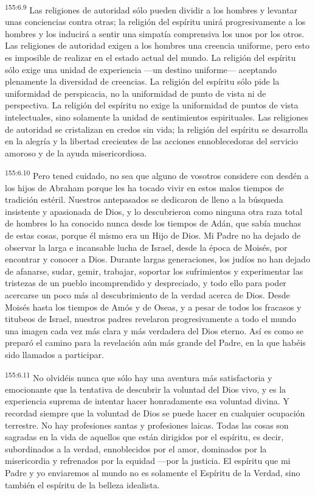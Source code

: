 \par 
\textsuperscript{155:6.9} Las religiones de autoridad sólo pueden dividir a los hombres y levantar unas conciencias contra otras; la religión del espíritu unirá progresivamente a los hombres y los inducirá a sentir una simpatía comprensiva los unos por los otros. Las religiones de autoridad exigen a los hombres una creencia uniforme, pero esto es imposible de realizar en el estado actual del mundo. La religión del espíritu sólo exige una unidad de experiencia ---un destino uniforme--- aceptando plenamente la diversidad de creencias. La religión del espíritu sólo pide la uniformidad de perspicacia, no la uniformidad de punto de vista ni de perspectiva. La religión del espíritu no exige la uniformidad de puntos de vista intelectuales, sino solamente la unidad de sentimientos espirituales. Las religiones de autoridad se cristalizan en credos sin vida; la religión del espíritu se desarrolla en la alegría y la libertad crecientes de las acciones ennoblecedoras del servicio amoroso y de la ayuda misericordiosa.

\par 
\textsuperscript{155:6.10} Pero tened cuidado, no sea que alguno de vosotros considere con desdén a los hijos de Abraham porque les ha tocado vivir en estos malos tiempos de tradición estéril. Nuestros antepasados se dedicaron de lleno a la búsqueda insistente y apasionada de Dios, y lo descubrieron como ninguna otra raza total de hombres lo ha conocido nunca desde los tiempos de Adán, que sabía muchas de estas cosas, porque él mismo era un Hijo de Dios. Mi Padre no ha dejado de observar la larga e incansable lucha de Israel, desde la época de Moisés, por encontrar y conocer a Dios. Durante largas generaciones, los judíos no han dejado de afanarse, sudar, gemir, trabajar, soportar los sufrimientos y experimentar las tristezas de un pueblo incomprendido y despreciado, y todo ello para poder acercarse un poco más al descubrimiento de la verdad acerca de Dios. Desde Moisés hasta los tiempos de Amós y de Oseas, y a pesar de todos los fracasos y titubeos de Israel, nuestros padres revelaron progresivamente a todo el mundo una imagen cada vez más clara y más verdadera del Dios eterno. Así es como se preparó el camino para la revelación aún más grande del Padre, en la que habéis sido llamados a participar.

\par 
\textsuperscript{155:6.11} No olvidéis nunca que sólo hay una aventura más satisfactoria y emocionante que la tentativa de descubrir la voluntad del Dios vivo, y es la experiencia suprema de intentar hacer honradamente esa voluntad divina. Y recordad siempre que la voluntad de Dios se puede hacer en cualquier ocupación terrestre. No hay profesiones santas y profesiones laicas. Todas las cosas son sagradas en la vida de aquellos que están dirigidos por el espíritu, es decir, subordinados a la verdad, ennoblecidos por el amor, dominados por la misericordia y refrenados por la equidad ---por la justicia. El espíritu que mi Padre y yo enviaremos al mundo no es solamente el Espíritu de la Verdad, sino también el espíritu de la belleza idealista.

